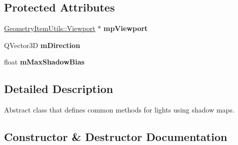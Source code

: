 \subsection*{Protected Attributes}
\begin{DoxyCompactItemize}
\item 
\mbox{\label{class_geometry_engine_1_1_geometry_world_item_1_1_geometry_light_1_1_shadow_map_light_ac947ba6b3dd5dfa22aacf5ec081a167a}} 
\mbox{\hyperlink{class_geometry_engine_1_1_geometry_item_utils_1_1_viewport}{Geometry\+Item\+Utils\+::\+Viewport}} $\ast$ {\bfseries mp\+Viewport}
\item 
\mbox{\label{class_geometry_engine_1_1_geometry_world_item_1_1_geometry_light_1_1_shadow_map_light_ada375af833c52af24c2190d04fcfabf9}} 
Q\+Vector3D {\bfseries m\+Direction}
\item 
\mbox{\label{class_geometry_engine_1_1_geometry_world_item_1_1_geometry_light_1_1_shadow_map_light_aa123442c381560bdaba167e911242c38}} 
float {\bfseries m\+Max\+Shadow\+Bias}
\end{DoxyCompactItemize}


\subsection{Detailed Description}
Abstract class that defines common methods for lights using shadow maps. 

\subsection{Constructor \& Destructor Documentation}
\mbox{\label{class_geometry_engine_1_1_geometry_world_item_1_1_geometry_light_1_1_shadow_map_light_ad96e826602604d426f22339ff319e1cf}} 
